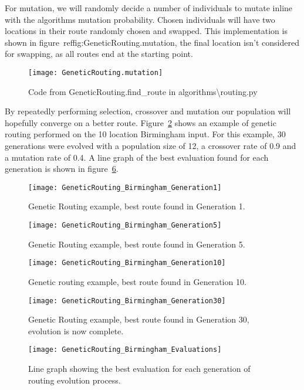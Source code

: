 \noindent
For mutation, we will randomly decide a number of individuals to mutate inline with the algorithms mutation
probability.
Chosen individuals will have two locations in their route randomly chosen and swapped.
This implementation is shown in figure~ref{fig:GeneticRouting.mutation}, the final location isn't considered for
swapping, as all routes end at the starting point.
\begin{figure}[H]
    \centering
    \texttt{[image: GeneticRouting.mutation]}
    \caption{Code from GeneticRouting.find\_route in algorithms\textbackslash routing.py}
    \label{fig:GeneticRouting.mutation}
\end{figure}

\noindent
By repeatedly performing selection, crossover and mutation our population will hopefully converge on a better route.
Figure~\ref{fig:GeneticRouting_Birmingham_Generation1} shows an example of genetic routing performed on the 10
location Birmingham input.
For this example, 30 generations were evolved with a population size of 12, a crossover rate of 0.9 and a mutation
rate of 0.4.
A line graph of the best evaluation found for each generation is shown in figure~\ref{fig:GeneticRouting_Birmingham_Evaluations}.
\begin{figure}[H]
    \ContinuedFloat*
    \centering
    \texttt{[image: GeneticRouting\_Birmingham\_Generation1]}
    \caption{Genetic Routing example, best route found in Generation 1.}
    \label{fig:GeneticRouting_Birmingham_Generation1}
\end{figure}
\begin{figure}[H]
    \ContinuedFloat
    \centering
    \texttt{[image: GeneticRouting\_Birmingham\_Generation5]}
    \caption{Genetic Routing example, best route found in Generation 5.}
    \label{fig:GeneticRouting_Birmingham_Generation5}
\end{figure}
\begin{figure}[H]
    \ContinuedFloat
    \centering
    \texttt{[image: GeneticRouting\_Birmingham\_Generation10]}
    \caption{Genetic routing example, best route found in Generation 10.}
    \label{fig:GeneticRouting_Birmingham_Generation10}
\end{figure}
\begin{figure}[H]
    \ContinuedFloat
    \centering
    \texttt{[image: GeneticRouting\_Birmingham\_Generation30]}
    \caption{Genetic Routing example, best route found in Generation 30, evolution is now complete.}
    \label{fig:GeneticRouting_Birmingham_Generation30}
\end{figure}
\begin{figure}[H]
    \centering
    \texttt{[image: GeneticRouting\_Birmingham\_Evaluations]}
    \caption{Line graph showing the best evaluation for each generation of routing evolution process.}
    \label{fig:GeneticRouting_Birmingham_Evaluations}
\end{figure}

